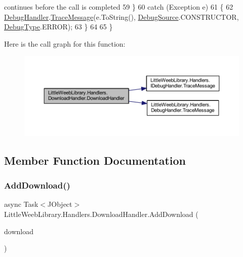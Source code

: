 \begin{DoxyCode}
{       continues before the call is completed}
59             \}
60             \textcolor{keywordflow}{catch} (Exception e)
61             \{
62                 \mbox{\hyperlink{class_little_weeb_library_1_1_handlers_1_1_download_handler_a9f1aedadbd6f343d8de1c54724eca11e}{DebugHandler}}.\mbox{\hyperlink{interface_little_weeb_library_1_1_handlers_1_1_i_debug_handler_a2e405bc3492e683cd3702fae125221bc}{TraceMessage}}(e.ToString(), 
      \mbox{\hyperlink{namespace_little_weeb_library_1_1_handlers_a2a6ca0775121c9c503d58aa254d292be}{DebugSource}}.CONSTRUCTOR, \mbox{\hyperlink{namespace_little_weeb_library_1_1_handlers_ab66019ed40462876ec4e61bb3ccb0a62}{DebugType}}.ERROR);
63             \}
64 
65         \}
\end{DoxyCode}
Here is the call graph for this function\+:\nopagebreak
\begin{figure}[H]
\begin{center}
\leavevmode
\includegraphics[width=350pt]{class_little_weeb_library_1_1_handlers_1_1_download_handler_ae98f5b136d09bb9f619bfad68f8d8bf7_cgraph}
\end{center}
\end{figure}


\subsection{Member Function Documentation}
\mbox{\label{class_little_weeb_library_1_1_handlers_1_1_download_handler_ad28cb47c19cac5e761ceff86ea021a02}} 
\subsubsection{\texorpdfstring{Add\+Download()}{AddDownload()}}
{\footnotesize\ttfamily async Task$<$J\+Object$>$ Little\+Weeb\+Library.\+Handlers.\+Download\+Handler.\+Add\+Download (\begin{DoxyParamCaption}\item[{\mbox{\hyperlink{class_little_weeb_library_1_1_models_1_1_json_download_info}{Json\+Download\+Info}}}]{download }\end{DoxyParamCaption})}



